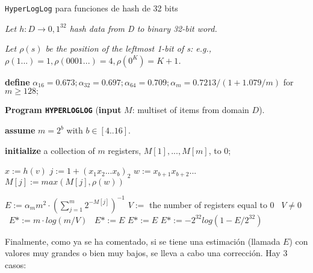 \begin{algorithm}[h]
\caption{\texttt{HyperLogLog} para funciones de hash de 32 bits}
\textit{Let $h: D\rightarrow{0,1}^{32}$ hash data from D to binary 32-bit word.}

\textit{Let $\rho(s)$ be the position of the leftmost 1-bit of s: e.g.,
$\rho(1...) = 1, \rho(0001...) = 4, \rho(0^K) = K + 1$.}

\textbf{define} $\alpha_{16}=0.673;\alpha_{32}=0.697;\alpha_{64}=0.709;\alpha_m=0.7213/(1+1.079/m)$
for $m \geq 128;$

\textbf{Program \texttt{HYPERLOGLOG}} (\textbf{input} $M$: multiset of items from domain $D$).

\textbf{assume} $m=2^b$ with $ b\in[4..16]$.

\textbf{initialize} a collection of $m$ registers, $M[1],...,M[m]$, to 0;

\begin{algorithmic}
            \STATE $x  := h(v)$
            \STATE $j   := 1 + (x_1 x_2 ... x_b)_2$ 
            \STATE $w := x_{b+1} x_{b+2} ... $
            \STATE $M[j] := max(M[j],\rho(w))$
    \ENDFOR

    \STATE $E:=\alpha _m m^2·\left(\sum\limits_{j=1}^m 2^{-M[j]}\right)^{-1}$ 
        \STATE $V :=$ the number of registers equal to $0$
        \STATE \algorithmicif\ $V \neq 0$ \algorithmicthen\ $E* := m \cdot log(m / V)$ \algorithmicelse\ $E* := E$
    \ENDIF
        \STATE $E*:=E$ 
    \ELSE
        \STATE $E* := -2^{32}log(1-E/2^{32})$ 
    \ENDIF
\end{algorithmic}
\end{algorithm}

Finalmente, como ya se ha comentado, si se tiene una estimación (llamada $E$) con valores muy
grandes o bien muy bajos, se lleva a cabo una corrección. Hay 3 casos:

